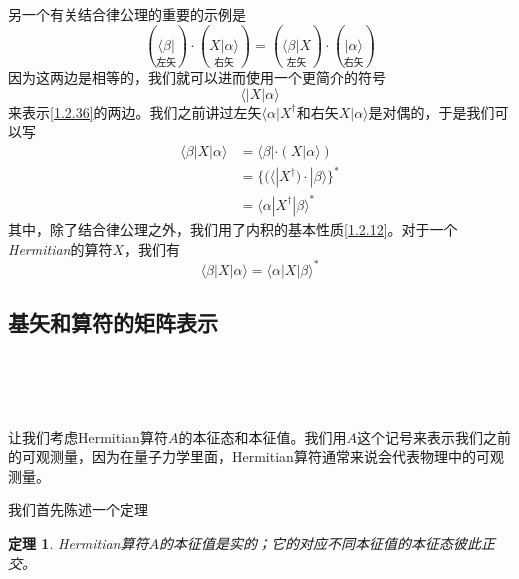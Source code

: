 \documentclass[UTF8,twoside]{ctexart}
\newtheorem{theo}{定理}[section]
\def\be{\begin{equation}}
\def\ee{\end{equation}}
\begin{document}
另一个有关结合律公理的重要的示例是
\be\label{1.2.36}
(\underset{\text{左矢}}{\langle\beta|})\cdot(\underset{\text{右矢}}{X|\alpha\rangle}) = (\underset{\text{左矢}}{\langle\beta|X})\cdot(\underset{\text{右矢}}{|\alpha\rangle})
\ee
因为这两边是相等的，我们就可以进而使用一个更简介的符号
\be
\langle|X|\alpha\rangle
\ee
来表示\eqref{1.2.36}的两边。我们之前讲过左矢$\langle\alpha|X^\dagger$和右矢$X|\alpha\rangle$是对偶的，于是我们可以写
\be\label{1.2.38}
\begin{split}
\langle\beta|X|\alpha\rangle& = \langle\beta|\cdot(X|\alpha\rangle)\\
&=\{(\langle|X^\dagger)\cdot|\beta\rangle\}^*\\
&=\langle\alpha|X^\dagger|\beta\rangle^*
\end{split}
\ee
其中，除了结合律公理之外，我们用了内积的基本性质\eqref{1.2.12}。对于一个{\it Hermitian}的算符$X$，我们有
\be
\langle\beta|X|\alpha\rangle = \langle\alpha|X|\beta\rangle^*
\ee



\subsection{基矢和算符的矩阵表示}\label{s1.3}

\noindent \\

\noindent {}  \\

\


\noindent 让我们考虑Hermitian算符$A$的本征态和本征值。我们用$A$这个记号来表示我们之前的可观测量，因为在量子力学里面，Hermitian算符通常来说会代表物理中的可观测量。

我们首先陈述一个定理

\begin{theo}
Hermitian算符$A$的本征值是实的；它的对应不同本征值的本征态彼此正交。
\end{theo}
\end{document}
